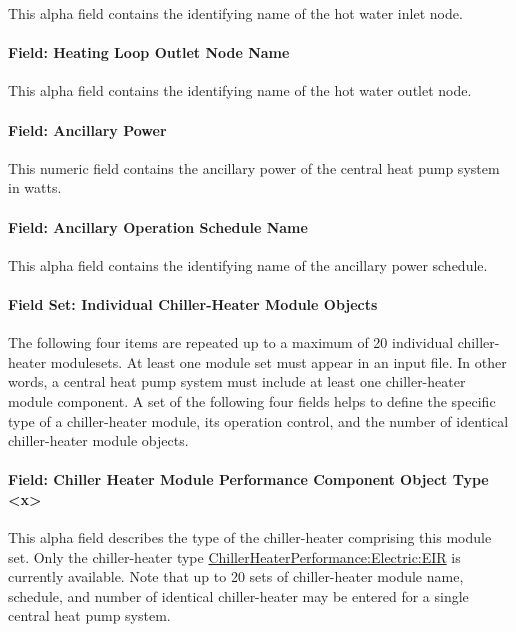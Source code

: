 This alpha field contains the identifying name of the hot water inlet node.

\paragraph{Field: Heating Loop Outlet Node Name}\label{field-heating-loop-outlet-node-name}

This alpha field contains the identifying name of the hot water outlet node.

\paragraph{Field: Ancillary Power}\label{field-ancillary-power-000}

This numeric field contains the ancillary power of the central heat pump system in watts.

\paragraph{Field: Ancillary Operation Schedule Name}\label{field-ancillary-operation-schedule-name}

This alpha field contains the identifying name of the ancillary power schedule.

\paragraph{Field Set: Individual Chiller-Heater Module Objects}\label{field-set-individual-chiller-heater-module-objects}

The following four items are repeated up to a maximum of 20 individual chiller-heater modulesets. At least one module set must appear in an input file. In other words, a central heat pump system must include at least one chiller-heater module component. A set of the following four fields helps to define the specific type of a chiller-heater module, its operation control, and the number of identical chiller-heater module objects.

\paragraph{Field: Chiller Heater Module Performance Component Object Type \textless{}x\textgreater{}}\label{field-chiller-heater-module-performance-component-object-type-x}

This alpha field describes the type of the chiller-heater comprising this module set. Only the chiller-heater type \hyperref[chillerheaterperformancelectriceir]{ChillerHeaterPerformance:Electric:EIR} is currently available. Note that up to 20 sets of chiller-heater module name, schedule, and number of identical chiller-heater may be entered for a single central heat pump system.

